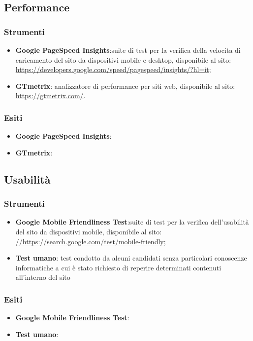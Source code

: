\documentclass[a4paper,12pt]{article}
\begin{document}
\subsection{Performance}
\subsubsection{Strumenti}
 \begin{itemize}
 	\item \textbf{Google PageSpeed Insights}:suite di test per la verifica della velocita di caricamento del sito da dispositivi mobile e desktop, disponibile al sito:\\
 	\url{https://developers.google.com/speed/pagespeed/insights/?hl=it};
 	\item \textbf{GTmetrix}: analizzatore di performance per siti web, disponibile al sito:\\
 	\url{https://gtmetrix.com/}.
 \end{itemize}
\subsubsection{Esiti}
\begin{itemize}
	\item \textbf{Google PageSpeed Insights}:
	\item \textbf{GTmetrix}:
\end{itemize}
\subsection{Usabilità}
\subsubsection{Strumenti}
\begin{itemize}
	\item \textbf{Google Mobile Friendliness Test}:suite di test per la verifica dell’usabilità del	sito da dispositivi mobile, disponibile al sito:\\
	\url{//https://search.google.com/test/mobile-friendly};
	\item \textbf{Test umano}: test condotto da alcuni candidati senza particolari conoscenze informatiche a cui è stato richiesto di reperire determinati contenuti all’interno del sito
\end{itemize}
\subsubsection{Esiti}
\begin{itemize}
	\item \textbf{Google Mobile Friendliness Test}:
	\item \textbf{Test umano}: 
\end{itemize}
\end{document}
